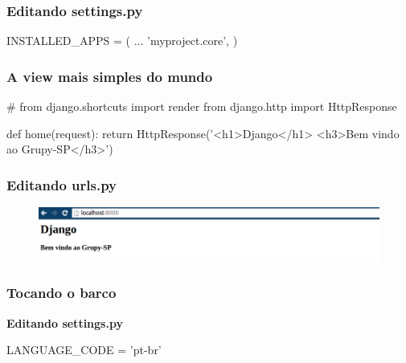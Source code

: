 \documentclass[aspectratio=169]{beamer}
\begin{document}
{\begin{frame}
\end{frame}


\begin{frame}[fragile]\frametitle{Editando settings.py}

\begin{pythoncode}
INSTALLED_APPS = (
    ...
    'myproject.core',
)
\end{pythoncode}

\end{frame}


\begin{frame}[fragile]\frametitle{A view mais simples do mundo}

\begin{pythoncode}
# from django.shortcuts import render
from django.http import HttpResponse

def home(request):
    return HttpResponse('<h1>Django</h1>
                         <h3>Bem vindo ao Grupy-SP</h3>')
\end{pythoncode}

\end{frame}


\begin{frame}[fragile]\frametitle{Editando urls.py}


\end{frame}

\begin{frame}

    \begin{figure}[h]
      \centering
        \includegraphics[width=.9\paperwidth]{img/HttpResponse.png}
    \end{figure}

\end{frame}


\begin{frame}[fragile]\frametitle{Tocando o barco}

\textbf{Editando settings.py}

\begin{pythoncode}
LANGUAGE_CODE = 'pt-br'


\end{pythoncode}
\end{frame}}
\end{document}
